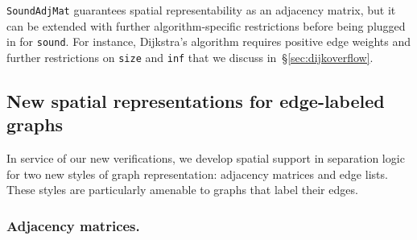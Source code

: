 \texttt{SoundAdjMat} guarantees spatial representability 
as an adjacency matrix, but it can be extended with further 
algorithm-specific restrictions before
being plugged in for \texttt{sound}. For instance, Dijkstra's algorithm 
requires positive edge weights and further restrictions on 
\texttt{size} and \texttt{inf} that we discuss in~\S\ref{sec:dijkoverflow}.

\subsection{New spatial representations for edge-labeled graphs}
\label{sec:newspatial}

In service of our new verifications, we develop spatial support in separation 
logic for two new styles of graph representation:
adjacency matrices and edge lists. These styles are particularly
amenable to graphs that label their edges.


\subsubsection{Adjacency matrices.}

